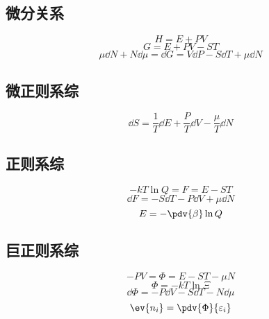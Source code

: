 
\begin{issues}
\issueDraft
{}
\end{issues}

\subsection{微分关系}
\begin{equation}
H = E + PV
\end{equation}
\begin{equation}
G = E + PV - ST
\end{equation}
\begin{equation}
\mu\dd{N} + N\dd{\mu} = \dd{G} = V\dd{P} - S\dd{T} + \mu\dd{N}
\end{equation}
\subsection{微正则系综}
\begin{equation}
\dd{S} = \frac1T \dd{E} + \frac{P}{T} \dd{V} - \frac{\mu }{T} \dd{N}
\end{equation}
\subsection{正则系综}
\begin{equation}
- kT\ln Q = F = E - ST
\end{equation}
\begin{equation}
\dd{F} = -S\dd{T} - P\dd{V} + \mu\dd{N}
\end{equation}
\begin{equation}
E = -\pdv{\beta} \ln Q
\end{equation}
\subsection{巨正则系综}
\begin{equation}
- PV = \Phi  = E - ST - \mu N
\end{equation}
\begin{equation}
\Phi  =  - kT\ln \Xi 
\end{equation}
\begin{equation}
\dd{\Phi} =  - P\dd{V} - S\dd{T} - N\dd{\mu}
\end{equation}
\begin{equation}
\ev{n_i} = \pdv{\Phi}{\varepsilon_i}
\end{equation}
